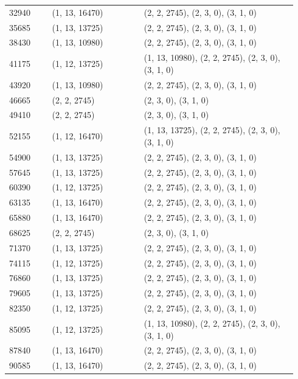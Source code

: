 \begin{longtable}{@{}p{0.14\linewidth}p{0.30\linewidth}p{0.50\linewidth}@{}}
32940  & (1, 13, 16470) & (2, 2, 2745), (2, 3, 0), (3, 1, 0)                  \\
35685  & (1, 13, 13725) & (2, 2, 2745), (2, 3, 0), (3, 1, 0)                  \\
38430  & (1, 13, 10980) & (2, 2, 2745), (2, 3, 0), (3, 1, 0)                  \\
41175  & (1, 12, 13725) & (1, 13, 10980), (2, 2, 2745), (2, 3, 0), (3, 1, 0)  \\
43920  & (1, 13, 10980) & (2, 2, 2745), (2, 3, 0), (3, 1, 0)                  \\
46665  & (2, 2, 2745)   & (2, 3, 0), (3, 1, 0)                                \\
49410  & (2, 2, 2745)   & (2, 3, 0), (3, 1, 0)                                \\
52155  & (1, 12, 16470) & (1, 13, 13725), (2, 2, 2745), (2, 3, 0), (3, 1, 0)  \\
54900  & (1, 13, 13725) & (2, 2, 2745), (2, 3, 0), (3, 1, 0)                  \\
57645  & (1, 13, 13725) & (2, 2, 2745), (2, 3, 0), (3, 1, 0)                  \\
60390  & (1, 12, 13725) & (2, 2, 2745), (2, 3, 0), (3, 1, 0)                  \\
63135  & (1, 13, 16470) & (2, 2, 2745), (2, 3, 0), (3, 1, 0)                  \\
65880  & (1, 13, 16470) & (2, 2, 2745), (2, 3, 0), (3, 1, 0)                  \\
68625  & (2, 2, 2745)   & (2, 3, 0), (3, 1, 0)                                \\
71370  & (1, 13, 13725) & (2, 2, 2745), (2, 3, 0), (3, 1, 0)                  \\
74115  & (1, 12, 13725) & (2, 2, 2745), (2, 3, 0), (3, 1, 0)                  \\
76860  & (1, 13, 13725) & (2, 2, 2745), (2, 3, 0), (3, 1, 0)                  \\
79605  & (1, 13, 13725) & (2, 2, 2745), (2, 3, 0), (3, 1, 0)                  \\
82350  & (1, 12, 13725) & (2, 2, 2745), (2, 3, 0), (3, 1, 0)                  \\
85095  & (1, 12, 13725) & (1, 13, 10980), (2, 2, 2745), (2, 3, 0), (3, 1, 0)  \\
87840  & (1, 13, 16470) & (2, 2, 2745), (2, 3, 0), (3, 1, 0)                  \\
90585  & (1, 13, 16470) & (2, 2, 2745), (2, 3, 0), (3, 1, 0)                  \\

\end{longtable}
